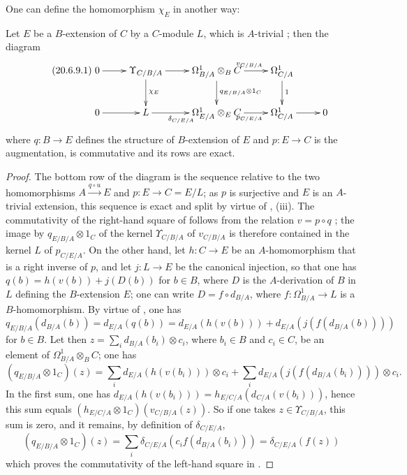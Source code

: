 One can define the homomorphism $\chi_E$ in another way:
\begin{proposition}[20.6.9]
\label{0.20.6.9}
Let $E$ be a $B$-extension of $C$ by a $C$-module $L$, which is $A$-trivial ; then the diagram
\begin{equation}
\tag{20.6.9.1}
  \label{0.20.6.9.1}
\xymatrix{
  0 \ar[r] & \Upsilon_{C/B/A} \ar[r] \ar[d]^{\chi_E} & \Omega^1_{B/A}\otimes_B C \ar[r]^{v_{C/B/A}} \ar[d]^{q_{E/B/A}\otimes 1_C} & \Omega^1_{C/A} \ar[d]^{1} \\
  0 \ar[r] & L \ar[r]_{\delta_{C/E/A}} & \Omega^1_{E/A}\otimes_E C \ar[r]_{p_{C/E/A}} & \Omega^1_{C/A} \ar[r] & 0
}
\end{equation}
where $q:B\to E$ defines the structure of $B$-extension of $E$ and $p:E\to C$ is the augmentation, is commutative and its rows are exact.
\end{proposition}

\begin{proof}
The bottom row of the diagram is the sequence  relative to the two homomorphisms $A\xrightarrow{q\circ u}E$ and $p:E\to C=E/L$; as $p$ is surjective and $E$ is an $A$-trivial extension, this sequence is exact and split by virtue of , (iii).
The commutativity of the right-hand square of  follows from the relation $v=p\circ q$ ; the image by $q_{E/B/A}\otimes 1_C$ of the kernel $\Upsilon_{C/B/A}$ of $v_{C/B/A}$ is therefore contained in the kernel $L$ of $p_{C/E/A}$.
On the other hand, let $h:C\to E$ be an $A$-homomorphism that is a right inverse of $p$, and let $j:L\to E$ be the canonical injection, so that one has $q(b)=h(v(b))+j(D(b))$ for $b\in B$, where $D$ is the $A$-derivation of $B$ in $L$ defining the $B$-extension $E$; one can write $D=f\circ d_{B/A}$, where $f:\Omega^1_{B/A}\to L$ is a $B$-homomorphism.
By virtue of , one has $q_{E/B/A}(d_{B/A}(b))=d_{E/A}(q(b))=d_{E/A}(h(v(b)))+d_{E/A}(j(f(d_{B/A}(b))))$ for $b\in B$.
Let then $z=\sum_i d_{B/A}(b_i)\otimes c_i$, where $b_i\in B$ and $c_i\in C$, be an element of $\Omega^1_{B/A}\otimes_B C$; one has
\[
  (q_{E/B/A}\otimes 1_C)(z)=\sum_i d_{E/A}(h(v(b_i)))\otimes c_i+\sum_i d_{E/A}(j(f(d_{B/A}(b_i))))\otimes c_i.
\]
In the first sum, one has $d_{E/A}(h(v(b_i)))=h_{E/C/A}(d_{C/A}(v(b_i)))$, hence this sum equals $(h_{E/C/A}\otimes 1_C)(v_{C/B/A}(z))$.
So if one takes $z\in\Upsilon_{C/B/A}$, this sum is zero, and it remains, by definition of $\delta_{C/E/A}$,
\[
  (q_{E/B/A}\otimes 1_C)(z)=\sum_i\delta_{C/E/A}(c_i f(d_{B/A}(b_i)))=\delta_{C/E/A}(f(z))
\]
which proves the commutativity of the left-hand square in .
\end{proof}

